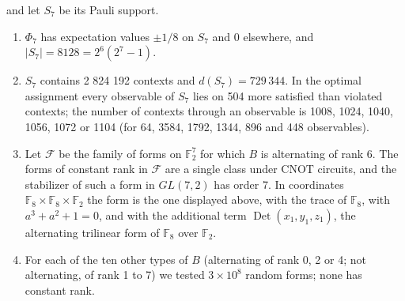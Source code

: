 \documentclass[11pt,a4paper]{article}
\providecommand{\tightlist}{\setlength{\itemsep}{0pt}\setlength{\parskip}{0pt}}
\begin{document}
and let \(S_7\) be its Pauli support.

\begin{enumerate}
\def\labelenumi{\arabic{enumi}.}
\tightlist
\item
  \(\Phi_7\) has expectation values \(\pm 1/8\) on \(S_7\) and \(0\) elsewhere, and \(|S_7| = 8128 = 2^6(2^7-1)\).
\item
  \(S_7\) contains 2 824 192 contexts and \(d(S_7) = 729\,344\). In the optimal assignment every observable
  of \(S_7\) lies on 504 more satisfied than violated contexts; the number of contexts through an
  observable is 1008, 1024, 1040, 1056, 1072 or 1104 (for 64, 3584, 1792, 1344, 896 and 448 observables).
\item
  Let \(\mathcal{F}\) be the family of forms on \(\mathbb{F}_2^7\) for which \(B\) is alternating of rank 6.
  The forms of constant rank in \(\mathcal{F}\) are a single class under CNOT circuits, and the stabilizer
  of such a form in \(GL(7,2)\) has order 7. In coordinates
  \(\mathbb{F}_8 \times \mathbb{F}_8 \times \mathbb{F}_2\) the form is the one displayed above, with the
  trace of \(\mathbb{F}_8\), with \(a^3 + a^2 + 1 = 0\), and with the additional term \(\operatorname{Det}(x_1,y_1,z_1)\),
  the alternating trilinear form of \(\mathbb{F}_8\) over \(\mathbb{F}_2\).
\item
  For each of the ten other types of \(B\) (alternating of rank 0, 2 or 4; not alternating, of rank 1
  to 7) we tested \(3 \times 10^8\) random forms; none has constant rank.
\end{enumerate}
\end{document}
